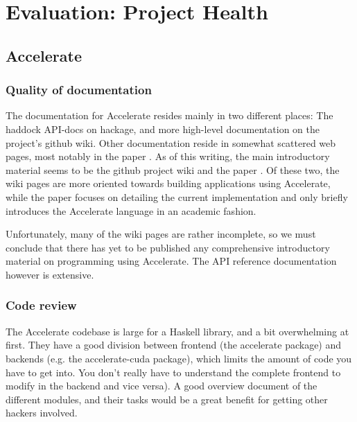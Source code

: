 
\chapter{Evaluation: Project Health}

\section{Accelerate}
\subsection{Quality of documentation}

The documentation for Accelerate resides mainly in two different places: The
haddock API-docs on hackage, and more high-level documentation on the project's
github wiki.
Other documentation reside in somewhat scattered web pages, most notably in the
paper \cite{chakravarty2011accelerating}.
As of this writing, the main introductory material seems to be the github
project wiki and the paper \cite{chakravarty2011accelerating}. Of these two,
the wiki pages are more oriented towards building applications using
Accelerate, while the paper focuses on detailing the current implementation and
only briefly introduces the Accelerate language in an academic fashion.

Unfortunately, many of the wiki pages are rather incomplete, so we must
conclude that there has yet to be published any comprehensive introductory
material on programming using Accelerate.
The API reference documentation however is extensive.

\subsection{Code review}

The Accelerate codebase is large for a Haskell library, and a bit
overwhelming at first. They have a good division between frontend
(the accelerate package) and backends (e.g. the accelerate-cuda
package), which limits the amount of code you have to get into. You
don't really have to understand the complete frontend to modify in
the backend and vice versa). A good overview document of the
different modules, and their tasks would be a great benefit for
getting other hackers involved.

